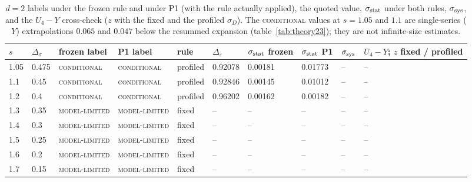 \documentclass[10pt,a4paper]{article}
\newcommand{\Ds}{\Delta_\sigma}
\newcommand{\De}{\Delta_\varepsilon}
\newcommand{\lbl}[1]{{\mdseries\scshape #1}}
\newcommand{\sstat}{\sigma_{\rm stat}}
\newcommand{\ssys}{\sigma_{\rm sys}}
\begin{document}
\begin{table}[htbp]\centering\scriptsize
\caption{$d=2$ labels under the frozen rule and under P1 (with the rule actually applied), the quoted value, $\sstat$ under both rules,
$\ssys$, and the $U_4-Y$ cross-check ($z$ with the fixed and the profiled $\sigma_D$). The \lbl{conditional} values at $s=1.05$ and $1.1$ are
single-series ($Y$) extrapolations $0.065$ and $0.047$ below the resummed expansion (table~\ref{tab:theory23}); they are not infinite-size
estimates.}\label{tab:2ddec}
\setlength{\tabcolsep}{4pt}\begin{tabular}{@{}llllllllll@{}}\toprule
$s$ & $\Ds$ & frozen label & P1 label & rule & $\De$ & $\sstat$ frozen & $\sstat$ P1 & $\ssys$ & $U_4-Y$; $z$ fixed / profiled \\\midrule
1.05 & 0.475 & \lbl{conditional} & \lbl{conditional} & profiled & 0.92078 & 0.00181 & 0.01773 & -- & -- \\
1.1 & 0.45 & \lbl{conditional} & \lbl{conditional} & profiled & 0.92846 & 0.00145 & 0.01012 & -- & -- \\
1.2 & 0.4 & \lbl{conditional} & \lbl{conditional} & profiled & 0.96202 & 0.00162 & 0.00182 & -- & -- \\
1.3 & 0.35 & \lbl{model-limited} & \lbl{model-limited} & fixed & -- & -- & -- & -- & -- \\
1.4 & 0.3 & \lbl{model-limited} & \lbl{model-limited} & fixed & -- & -- & -- & -- & -- \\
1.5 & 0.25 & \lbl{model-limited} & \lbl{model-limited} & fixed & -- & -- & -- & -- & -- \\
1.6 & 0.2 & \lbl{model-limited} & \lbl{model-limited} & fixed & -- & -- & -- & -- & -- \\
1.7 & 0.15 & \lbl{model-limited} & \lbl{model-limited} & fixed & -- & -- & -- & -- & -- \\
\bottomrule\end{tabular}
\end{table}
\end{document}
